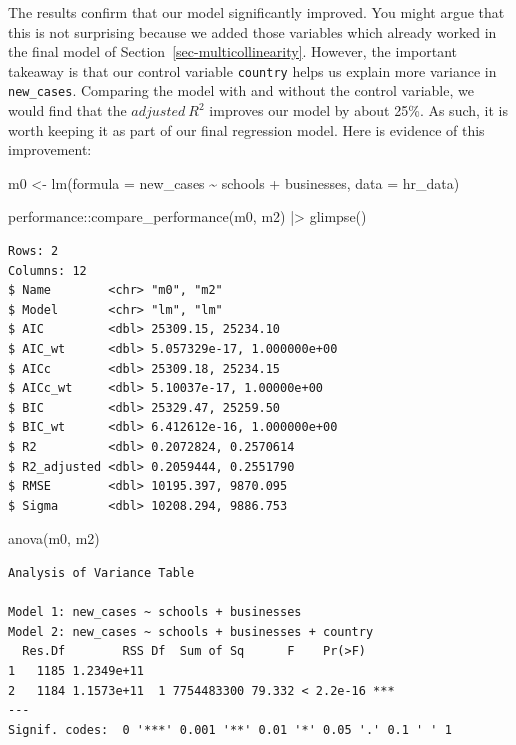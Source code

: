 \documentclass[
  letterpaper,
]{krantz}
\makeatletter
\newenvironment{Shaded}{\begin{snugshade}}{\end{snugshade}}
\newcommand{\AttributeTok}[1]{\textcolor[rgb]{0.40,0.45,0.13}{#1}}
\newcommand{\FunctionTok}[1]{\textcolor[rgb]{0.28,0.35,0.67}{#1}}
\newcommand{\NormalTok}[1]{\textcolor[rgb]{0.00,0.23,0.31}{#1}}
\newcommand{\OtherTok}[1]{\textcolor[rgb]{0.00,0.23,0.31}{#1}}
\newcommand{\SpecialCharTok}[1]{\textcolor[rgb]{0.37,0.37,0.37}{#1}}
\newenvironment{kframe}{%
\medskip{}
\setlength{\fboxsep}{.8em}
 \def\at@end@of@kframe{}%
 \ifinner\ifhmode%
  \def\at@end@of@kframe{\end{minipage}}%
  \begin{minipage}{\columnwidth}%
 \fi\fi%
 \def\FrameCommand##1{\hskip\@totalleftmargin \hskip-\fboxsep
 \colorbox{shadecolor}{##1}\hskip-\fboxsep
     \hskip-\linewidth \hskip-\@totalleftmargin \hskip\columnwidth}%
 \MakeFramed {\advance\hsize-\width
   \@totalleftmargin\z@ \linewidth\hsize
   \@setminipage}}%
 {\par\unskip\endMakeFramed%
 \at@end@of@kframe}
\renewenvironment{Shaded}{\begin{kframe}}{\end{kframe}}
\makeatother
\begin{document}
The results confirm that our model significantly improved. You might
argue that this is not surprising because we added those variables which
already worked in the final model of
Section~\ref{sec-multicollinearity}. However, the important takeaway is
that our control variable \texttt{country} helps us explain more
variance in \texttt{new\_cases}. Comparing the model with and without
the control variable, we would find that the \(adjusted\ R^2\) improves
our model by about 25\%. As such, it is worth keeping it as part of our
final regression model. Here is evidence of this improvement:

\begin{Shaded}
\begin{Highlighting}[]
\NormalTok{m0 }\OtherTok{\textless{}{-}} \FunctionTok{lm}\NormalTok{(}\AttributeTok{formula =}\NormalTok{ new\_cases }\SpecialCharTok{\textasciitilde{}}
\NormalTok{           schools }\SpecialCharTok{+}
\NormalTok{           businesses,}
         \AttributeTok{data =}\NormalTok{ hr\_data)}

\NormalTok{performance}\SpecialCharTok{::}\FunctionTok{compare\_performance}\NormalTok{(m0, m2) }\SpecialCharTok{|\textgreater{}}
  \FunctionTok{glimpse}\NormalTok{()}
\end{Highlighting}
\end{Shaded}

\begin{verbatim}
Rows: 2
Columns: 12
$ Name        <chr> "m0", "m2"
$ Model       <chr> "lm", "lm"
$ AIC         <dbl> 25309.15, 25234.10
$ AIC_wt      <dbl> 5.057329e-17, 1.000000e+00
$ AICc        <dbl> 25309.18, 25234.15
$ AICc_wt     <dbl> 5.10037e-17, 1.00000e+00
$ BIC         <dbl> 25329.47, 25259.50
$ BIC_wt      <dbl> 6.412612e-16, 1.000000e+00
$ R2          <dbl> 0.2072824, 0.2570614
$ R2_adjusted <dbl> 0.2059444, 0.2551790
$ RMSE        <dbl> 10195.397, 9870.095
$ Sigma       <dbl> 10208.294, 9886.753
\end{verbatim}

\begin{Shaded}
\begin{Highlighting}[]
\FunctionTok{anova}\NormalTok{(m0, m2)}
\end{Highlighting}
\end{Shaded}

\begin{verbatim}
Analysis of Variance Table

Model 1: new_cases ~ schools + businesses
Model 2: new_cases ~ schools + businesses + country
  Res.Df        RSS Df  Sum of Sq      F    Pr(>F)    
1   1185 1.2349e+11                                   
2   1184 1.1573e+11  1 7754483300 79.332 < 2.2e-16 ***
---
Signif. codes:  0 '***' 0.001 '**' 0.01 '*' 0.05 '.' 0.1 ' ' 1
\end{verbatim}
\end{document}
